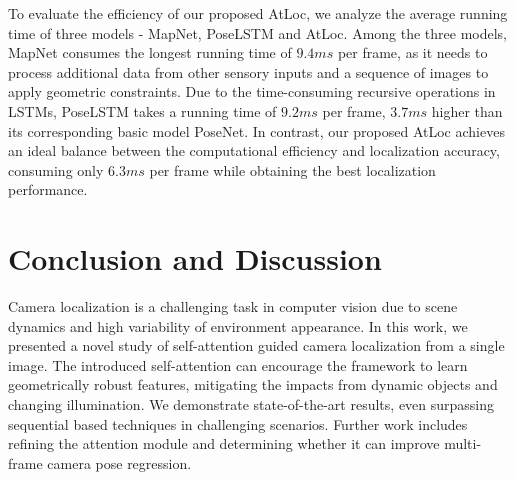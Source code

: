 \documentclass[letterpaper]{article}
\begin{document}
To evaluate the efficiency of our proposed AtLoc, we analyze the average running time of three models - MapNet, PoseLSTM and AtLoc. 
Among the three models, MapNet consumes the longest running time of $9.4 ms$ per frame, as it needs to process additional data from other sensory inputs and a sequence of images to apply geometric constraints. 
Due to the time-consuming recursive operations in LSTMs, PoseLSTM takes a running time of $9.2 ms$ per frame, $3.7 ms$ higher than its corresponding basic model PoseNet. 
In contrast, our proposed AtLoc achieves an ideal balance between the computational efficiency and localization accuracy, consuming only $6.3 ms$ per frame while obtaining the best localization performance.


\section{Conclusion and Discussion}
Camera localization is a challenging task in computer vision due to scene dynamics and high variability of environment appearance.
In this work, we presented a novel study of self-attention guided camera localization from a single image. 
The introduced self-attention can encourage the framework to learn geometrically robust features, mitigating the impacts from dynamic objects and changing illumination.
We demonstrate state-of-the-art results, even surpassing sequential based techniques in challenging scenarios. 
Further work includes refining the attention module and determining whether it can improve multi-frame camera pose regression.

\FloatBarrier



\end{document}
